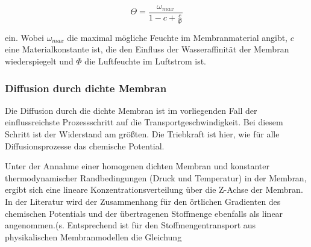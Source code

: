 \begin{normalsize}
\begin{LARGE}
\begin{equation}
\Theta = \dfrac{\omega_{max}}{1-c+\frac{c}{\Phi}}
\end{equation}

ein. Wobei $\omega_{max}$ die maximal mögliche Feuchte im Membranmaterial angibt, $c$ eine Materialkonstante ist, die den Einfluss der Wasseraffinität der Membran wiederspiegelt und $\Phi$ die Luftfeuchte im Luftstrom ist. 



\subsubsection{Diffusion durch dichte Membran}

Die Diffusion durch die dichte Membran ist im vorliegenden Fall der einflussreichste Prozessschritt auf die Transportgeschwindigkeit. Bei diesem Schritt ist der Widerstand am größten. Die Triebkraft ist hier, wie für alle Diffusionsprozesse das chemische Potential. 


Unter der Annahme einer homogenen dichten Membran und konstanter thermodynamischer Randbedingungen (Druck und Temperatur) in der Membran, ergibt sich eine lineare Konzentrationsverteilung über die Z-Achse der Membran. In der Literatur wird der Zusammenhang für den örtlichen Gradienten des chemischen Potentials und der übertragenen Stoffmenge ebenfalls als linear angenommen.(s.\cite{Koester.2015} 
Entsprechend ist für den Stoffmengentransport aus physikalischen Membranmodellen die Gleichung 


\end{LARGE}
\end{normalsize}
